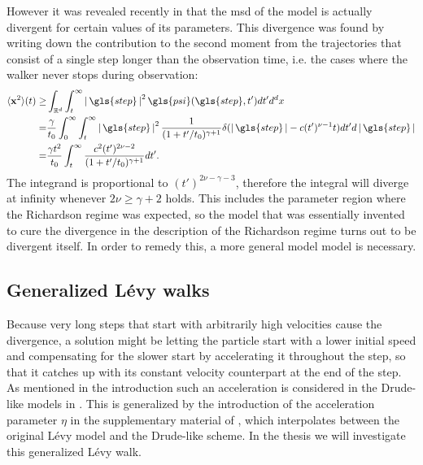 %
%

However it was revealed recently in 
\cite{radons2018} 
that the \gls{msd} of the model is actually divergent for certain values of its parameters. This divergence was found by writing down the contribution to the second moment from the trajectories that consist of a single step longer than the observation time, i.e. the cases where the walker never stops during observation:
%
\begin{align}
\mean{\ve{x}^2}(t) \geq& \int_{\mathbb{R}^d} \int_{t}^{\infty} \abs{\gls{step}}^{2} \gls{psi}(\gls{step},t') dt' d^{d}x \\
=& \frac{\gamma}{t_0} \int_{0}^{\infty} \int_{t}^{\infty} \abs{\gls{step}}^{2}  \frac{1}{(1+t'/t_0)^{\gamma+1}}  \delta(\abs{\gls{step}} - c (t')^{\nu-1}t)  dt' d\abs{\gls{step}} \\
=& \frac{\gamma t^2}{t_0}  \int_{t}^{\infty}   \frac{c^2 (t')^{2\nu-2}}{(1+t'/t_0)^{\gamma+1}}    dt'  .
\end{align}
%
The integrand is proportional to $(t')^{2\nu-\gamma-3}$, therefore the integral will diverge at infinity whenever $2 \nu \geq \gamma +2$ holds. This includes the parameter region where the Richardson regime was expected, so the model that was essentially invented to cure the divergence in the description of the Richardson regime turns out to be divergent itself. In order to remedy this, a more general model model is necessary.

\subsection{Generalized L\'evy walks}

Because very long steps that start with arbitrarily high velocities cause the divergence, a solution might be letting the particle start with a lower initial speed and compensating for the slower start by accelerating it throughout the step, so that it catches up with its constant velocity counterpart at the end of the step. \\
As mentioned in the introduction such an acceleration is considered in the Drude-like models in 
\cite{schulz1997, BarkaiKlafterBuch}. 
This is generalized by the introduction of the acceleration parameter $\eta$ in the supplementary material of 
\cite{radons2018}, 
which interpolates between the original L\'evy model and the Drude-like scheme. In the thesis we will investigate this generalized L\'evy walk.

